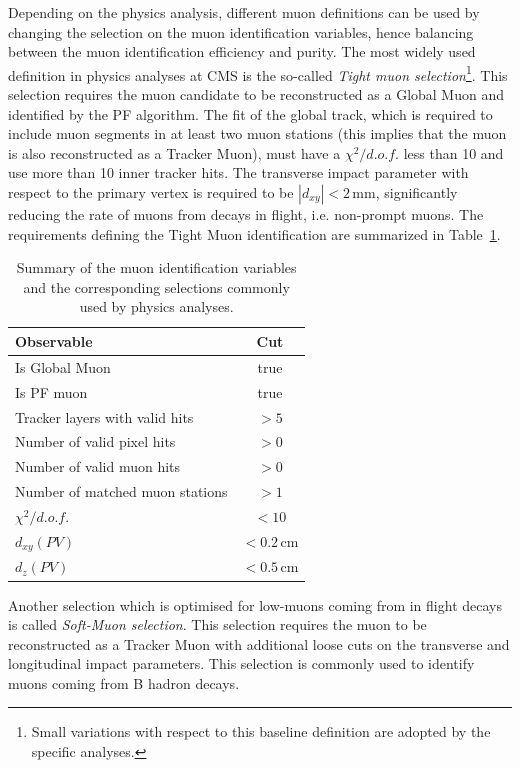 Depending on the physics analysis, different muon definitions can be used by changing the selection on the muon identification variables, hence balancing between the muon identification efficiency and purity. The most widely used definition in physics analyses at CMS is the so-called \emph{Tight muon selection}\footnote{Small variations with respect to this baseline definition are adopted by the specific analyses.}. This selection requires the muon candidate to be reconstructed as a Global Muon and identified by the PF algorithm. The fit of the global track, which is required to include muon segments in at least two muon stations (this implies that the muon is also reconstructed as a Tracker Muon), must have a $\chi^2/d.o.f.$ less than 10 and use more than 10 inner tracker hits. The transverse impact parameter with respect to the primary vertex is required to be $|d_{xy}|<2$\,mm, significantly reducing the rate of muons from decays in flight, i.e. non-prompt muons. The requirements defining the Tight Muon identification are summarized in Table~\ref{tab:tightmuon}.

\begin{table}[htb]
\caption{Summary of the muon identification variables and the corresponding selections commonly used by physics analyses.}\label{tab:tightmuon}
\centering
\begin{tabular}{lc}
\toprule
Observable & Cut \\
\midrule
Is Global Muon & true \\
Is PF muon & true \\
Tracker layers with valid hits & $>5$ \\
Number of valid pixel hits & $>0$ \\
Number of valid muon hits & $>0$ \\
Number of matched muon stations & $>1$ \\
$\chi^2/d.o.f.$ & $<10$ \\
$d_{xy}(PV)$ & $< 0.2$\,cm \\
$d_{z}(PV)$ & $< 0.5$\,cm \\
\bottomrule
\end{tabular}
\end{table}

Another selection which is optimised for low-\pt muons coming from in flight decays is called \emph{Soft-Muon selection}. This selection requires the muon to be reconstructed as a Tracker Muon with additional loose cuts on the transverse and longitudinal impact parameters. This selection is commonly used to identify muons coming from B hadron decays.

